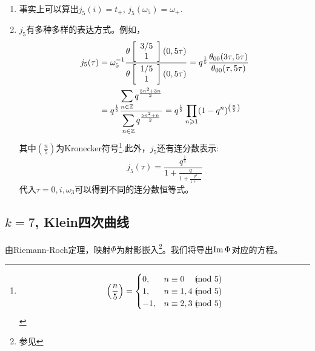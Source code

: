 \begin{remark}\
	\begin{enumerate}[1.]
		\item 事实上可以算出$j_5 (i)= t_+$, $j_5 (\omega_5)=\omega_+$.
		\item $j_5$有多种多样的表达方式。例如，
		\begin{equation*}
		\begin{aligned}
		j_5(\tau)=\;& \omega_5^{-1}\frac{\theta \left[\begin{array}{c}{3/5} \\ {1}\end{array}\right](0,5\tau)}{\theta \left[\begin{array}{c}{1/5} \\ {1}\end{array}\right](0,5\tau)}=q^{\frac{1}{5}} \frac{\theta_{00}(3\tau,5\tau)}{\theta_{00}(\tau,5\tau)}\\
		=\;& q^{\frac{1}{5}}\frac{\displaystyle \sum_{n \in \mathbb{Z}}q^{\frac{5n^2+3n}{2}}}{\displaystyle \sum_{n \in \mathbb{Z}}q^{\frac{5n^2+n}{2}}}=q^{\frac{1}{5}} \prod_{n \geqslant 1}(1-q^n)^{\left(\frac{n}{5}\right)} 
		\end{aligned}
		\end{equation*}
		其中$\left(\frac{n}{5} \right)$为Kronecker符号\footnote{$$\left(\frac{n}{5} \right)=\begin{cases}
			0, & n \equiv 0\phantom{,1}\;(\hspace{-3.4mm}\mod 5)\\
			1, & n \equiv 1,4 \;(\hspace{-3.4mm}\mod 5)\\
			-1, & n \equiv 2,3 \;(\hspace{-3.4mm}\mod 5)\\
			\end{cases}$$}.此外，$j_5$还有连分数表示:
		$$j_5(\tau)=\frac{q^{\frac{1}{5}}}{\displaystyle 1+\frac{q}{\displaystyle 1+\frac{q^2}{1+\cdots}}}$$
		代入$\tau=0,i,\omega_3$可以得到不同的连分数恒等式。
	\end{enumerate}
\end{remark}
\subsection{$k=7$, Klein四次曲线}
由Riemann-Roch定理，映射$\Phi$为射影嵌入\footnote{参见\cite[p246-247]{farkas2001theta}}。我们将导出$\operatorname{\operatorname{Im}} \Phi$对应的方程。

